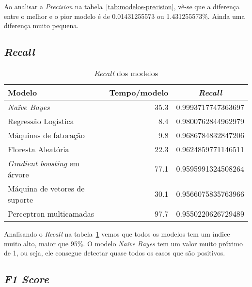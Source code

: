 Ao analisar a \textit{Precision} na tabela~\ref{tab:modelos-precision}, vê-se que a diferença entre o melhor e o pior modelo é de 0.01431255573 ou 1.431255573\%.
Ainda uma diferença muito pequena.

\subsection{\textit{Recall}}
\label{subsec:recall}

\begin{table}[h]
    \centering
    \begin{tabular}{|l|r|c|}
        \hline
        Modelo                               & Tempo/modelo & \textit{Recall}    \\
        \hline
        \textit{Naïve Bayes}                 & 35.3         & 0.9993717747363697 \\
        Regressão Logística                  & 8.4          & 0.9800762844962979 \\
        Máquinas de fatoração                & 9.8          & 0.9686784832847206 \\
        Floresta Aleatória                   & 22.3         & 0.9624859771146511 \\
        \textit{Gradient boosting} em árvore & 77.1         & 0.9595991324508264 \\
        Máquina de vetores de suporte        & 30.1         & 0.9566075835763966 \\
        Perceptron multicamadas              & 97.7         & 0.9550220626729489 \\
        \hline
    \end{tabular}
    \caption{\textit{Recall} dos modelos}
    \label{tab:modelos-recall}
\end{table}

Analisando o \textit{Recall} na tabela~\ref{tab:modelos-recall} vemos que todos os modelos tem um índice muito alto, maior que 95\%.
O modelo \textit{Naïve Bayes} tem um valor muito próximo de 1, ou seja, ele consegue detectar quase todos os casos que são positivos.

\subsection{\textit{F1 Score}}
\label{subsec:f1-score}

